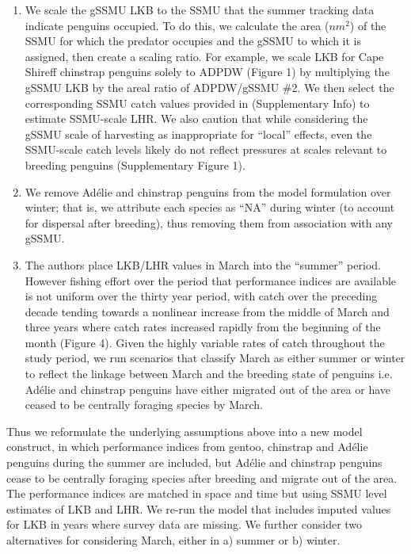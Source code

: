 \documentclass[]{elsarticle} %
\providecommand{\tightlist}{%
  \setlength{\itemsep}{0pt}\setlength{\parskip}{0pt}}
\begin{document}
\begin{enumerate}
\def\labelenumi{\arabic{enumi}.}
\tightlist
\item
  We scale the gSSMU LKB to the SSMU that the summer tracking data
  indicate penguins occupied. To do this, we calculate the area
  (\(nm^2\)) of the SSMU for which the predator occupies and the gSSMU
  to which it is assigned, then create a scaling ratio. For example, we
  scale LKB for Cape Shireff chinstrap penguins solely to ADPDW (Figure
  1) by multiplying the gSSMU LKB by the areal ratio of ADPDW/gSSMU \#2.
  We then select the corresponding SSMU catch values provided in
  \citet{Watters2020} (Supplementary Info) to estimate SSMU-scale LHR.
  We also caution that while considering the gSSMU scale of harvesting
  as inappropriate for ``local'' effects, even the SSMU-scale catch
  levels likely do not reflect pressures at scales relevant to breeding
  penguins (Supplementary Figure 1).\\
\item
  We remove Adélie and chinstrap penguins from the model formulation
  over winter; that is, we attribute each species as ``NA'' during
  winter (to account for dispersal after breeding), thus removing them
  from association with any gSSMU.\\
\item
  The authors place LKB/LHR values in March into the ``summer'' period.
  However fishing effort over the period that performance indices are
  available is not uniform over the thirty year period, with catch over
  the preceding decade tending towards a nonlinear increase from the
  middle of March and three years where catch rates increased rapidly
  from the beginning of the month (Figure 4). Given the highly variable
  rates of catch throughout the study period, we run scenarios that
  classify March as either summer or winter to reflect the linkage
  between March and the breeding state of penguins i.e. Adélie and
  chinstrap penguins have either migrated out of the area or have ceased
  to be centrally foraging species by March.
\end{enumerate}

Thus we reformulate the underlying assumptions above into a new model
construct, in which performance indices from gentoo, chinstrap and
Adélie penguins during the summer are included, but Adélie and chinstrap
penguins cease to be centrally foraging species after breeding and
migrate out of the area. The performance indices are matched in space
and time but using SSMU level estimates of LKB and LHR. We re-run the
model that includes imputed values for LKB in years where survey data
are missing. We further consider two alternatives for considering March,
either in a) summer or b) winter.
\end{document}
